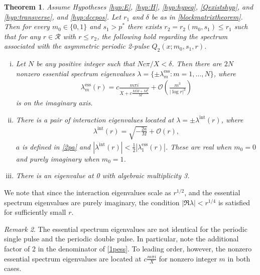 \documentclass[12pt]{elsarticle}
\theoremstyle{plain}
\newtheorem{theorem}{Theorem}
\theoremstyle{definition}
\theoremstyle{remark}
\newtheorem{remark}[theorem]{Remark}
\numberwithin{theorem}{section}
\numberwithin{equation}{section}
\begin{document}
\begin{theorem}\label{theorem:2peigsassym}
Assume Hypotheses \ref{hyp:E}, \ref{hyp:H}, \ref{hyp:hypeq}, \ref{Qexistshyp}, and \ref{hyp:transverse}, and \ref{hyp:dccpos}. Let $r_1$ and $\delta$ be as in \cref{blockmatrixtheorem}. Then for every $m_0 \in \{0, 1\}$ and $s_1 > p^*$ there exists $r_2 = r_2(m_0, s_1) \leq r_1$ such that for any $r \in \mathcal{R}$ with $r \leq r_2$, the following hold regarding the spectrum associated with the asymmetric periodic 2-pulse $Q_2(x; m_0, s_1, r)$.

\begin{enumerate}[(i)]
\item Let $N$ be any positive integer such that $N c \pi/X < \delta$. Then there are $2N$ nonzero essential spectrum eigenvalues $\lambda = \{ \pm \lambda_m^{\text{ess}} : m = 1, \dots, N \}$, where
\begin{align}\label{2pess}
\lambda_m^{\text{ess}}(r) = c \frac{m \pi i}{X + c \frac{M\tilde{M} + M_c^2}{M}} +  \mathcal{O}\left( \frac{m^3}{|\log r|^3} \right)
\end{align}
is on the imaginary axis.

\item There is a pair of interaction eigenvalues located at $\lambda = \pm \lambda^{\text{int}}(r)$, where
\begin{align*}
\lambda^{\text{int}}(r) = \sqrt{-\frac{2a}{M}} + \mathcal{O}\left( r \right),
\end{align*}
$a$ is defined in \cref{2pa} and $|\lambda^{\text{int}}(r)| < \frac{1}{2}|\lambda_1^{\text{ess}}(r)|$. These are real when $m_0 = 0$ and purely imaginary when $m_0 = 1$.
\item There is an eigenvalue at 0 with algebraic multiplicity 3. 
\end{enumerate}
\end{theorem}

\noi We note that since the interaction eigenvalues scale as $r^{1/2}$, and the essential spectrum eigenvalues are purely imaginary, the condition $|\Re \lambda| < r^{1/4}$ is satisfied for sufficiently small $r$.

\begin{remark}The essential spectrum eigenvalues are not identical for the periodic single pulse and the periodic double pulse. In particular, note the additional factor of 2 in the denominator of \cref{1pess}. To leading order, however, the nonzero essential spectrum eigenvalues are located at $c \frac{m \pi i}{X}$ for nonzero integer $m$ in both cases.
\end{remark}
\end{document}
